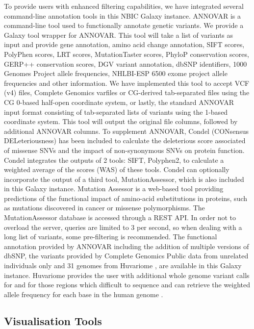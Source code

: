 To provide users with enhanced filtering capabilities, we have integrated several command-line annotation tools in this NBIC Galaxy instance. ANNOVAR \cite{annovar} is a command-line tool used to functionally annotate genetic variants. We provide a Galaxy tool wrapper for ANNOVAR. This tool will take a list of variants as input and provide gene annotation, amino acid change annotation, SIFT scores, PolyPhen scores, LRT scores, MutationTaster scores, PhyloP conservation scores, GERP++ conservation scores, DGV variant annotation, dbSNP identifiers, 1000 Genomes Project allele frequencies, NHLBI-ESP 6500 exome project allele frequencies and other information.  We have implemented this tool to accept VCF (v4) files, Complete Genomics varfiles or CG-derived tab-separated files using the CG 0-based half-open coordinate system, or lastly, the standard ANNOVAR input format consisting of tab-separated lists of variants using the 1-based coordinate system.  This tool will output the original file columns, followed by additional ANNOVAR columns.  To supplement ANNOVAR, Condel (CONsensus DELeteriousness) \cite{condel} has been included to calculate the deleterious score associated of missense SNVs and the impact of non-synonymous SNVs on protein function. Condel integrates the outputs of 2 tools: SIFT, Polyphen2, to calculate a weighted average of the scores (WAS) of these tools. Condel can optionally incorporate the output of a third tool, MutationAssessor, which is also included in this Galaxy instance. Mutation Assessor \cite{mutass} is a web-based tool providing predictions of the functional impact of amino-acid substitutions in proteins, such as mutations discovered in cancer or missense polymorphisms. The MutationAssessor database is accessed through a REST API.  In order not to overload the server, queries are limited to 3 per second, so when dealing with a long list of variants, some pre-filtering is recommended. The functional annotation provided by ANNOVAR including the addition of multiple versions of dbSNP, the variants provided by Complete Genomics Public data from unrelated individuals only \cite{url-cgftp} and 31 genomes from Huvariome \cite{huvariome}, are available in this Galaxy instance. Huvariome provides the user with additional whole genome variant calls for and for those regions which difficult to sequence and can retrieve the weighted allele frequency for each base in the human genome \cite{huvariome}.



\subsection*{Visualisation Tools}

